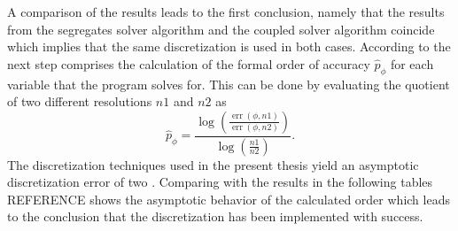 A comparison of the results leads to the first conclusion, namely that the results from the segregates solver algorithm and the coupled solver algorithm coincide which implies that the same discretization is used in both cases. According to \cite{salari00} the next step comprises the calculation of the formal order of accuracy \(\hat{p}_\phi\) for each variable that the program solves for. This can be done by evaluating the quotient of two different resolutions \(n1\) and \(n2\) as 
\begin{displaymath}
  \hat{p}_{\phi} = \frac{\log\left(\frac{\operatorname{err}(\phi,{n1})}{\operatorname{err}(\phi,{n2})}\right)}{\log\left(\frac{n1}{n2}\right)}.
\end{displaymath}
The discretization techniques used in the present thesis yield an asymptotic discretization error of two \cite{schäfer99}. Comparing with the results in the following tables REFERENCE shows the asymptotic behavior of the calculated order which leads to the conclusion that the discretization has been implemented with success.

